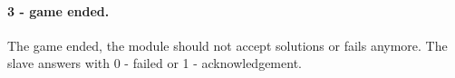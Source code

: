 \documentclass[a4paper, 12pt]{article}
\begin{document}
\paragraph*{3 - game ended.}
The game ended, the module should not accept solutions or fails anymore. The slave answers with 0 - failed or 1 - acknowledgement.
\end{document}
